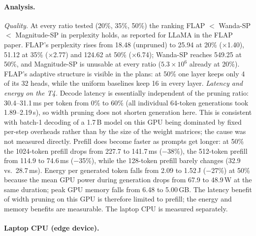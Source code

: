 \paragraph{Analysis.} \emph{Quality.} At every ratio tested (20\%, 35\%, 50\%) the ranking FLAP $<$ Wanda-SP $<$ Magnitude-SP in perplexity holds, as reported for LLaMA in the FLAP paper. FLAP's perplexity rises from 18.48 (unpruned) to 25.94 at 20\% ($\times$1.40), 51.12 at 35\% ($\times$2.77) and 124.62 at 50\% ($\times$6.74); Wanda-SP reaches 549.25 at 50\%, and Magnitude-SP is unusable at every ratio ($5.3\times10^{6}$ already at 20\%). FLAP's adaptive structure is visible in the plans: at 50\% one layer keeps only 4 of its 32 heads, while the uniform baselines keep 16 in every layer. \emph{Latency and energy on the T4.} Decode latency is essentially independent of the pruning ratio: 30.4--31.1\,ms per token from 0\% to 60\% (all individual 64-token generations took 1.89--2.19\,s), so width pruning does not shorten generation here. This is consistent with batch-1 decoding of a 1.7\,B model on this GPU being dominated by fixed per-step overheads rather than by the size of the weight matrices; the cause was not measured directly. Prefill does become faster as prompts get longer: at 50\% the 1024-token prefill drops from 227.7 to 141.7\,ms ($-$38\%), the 512-token prefill from 114.9 to 74.6\,ms ($-$35\%), while the 128-token prefill barely changes (32.9 vs.\ 28.7\,ms). Energy per generated token falls from 2.09 to 1.52\,J ($-$27\%) at 50\% because the mean GPU power during generation drops from 67.9 to 48.9\,W at the same duration; peak GPU memory falls from 6.48 to 5.00\,GB. The latency benefit of width pruning on this GPU is therefore limited to prefill; the energy and memory benefits are measurable. The laptop CPU is measured separately.

\paragraph{Laptop CPU (edge device).} 

